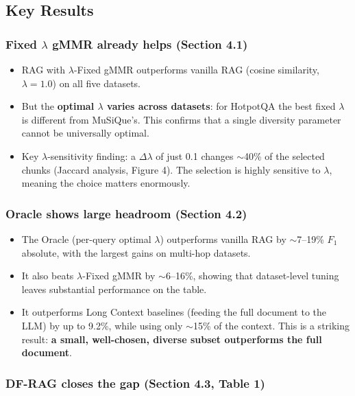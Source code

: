 \documentclass[11pt,a4paper]{article}
\begin{document}
\subsection{Key Results}

\subsubsection{Fixed $\lambda$ gMMR already helps (Section 4.1)}

\begin{itemize}[leftmargin=*]
	\item RAG with $\lambda$-Fixed gMMR outperforms vanilla RAG (cosine similarity, $\lambda = 1.0$) on all five datasets.
	\item But the \textbf{optimal $\lambda$ varies across datasets}: for HotpotQA the best fixed $\lambda$ is different from MuSiQue's. This confirms that a single diversity parameter cannot be universally optimal.
	\item Key $\lambda$-sensitivity finding: a $\Delta\lambda$ of just 0.1 changes $\sim$40\% of the selected chunks (Jaccard analysis, Figure 4). The selection is highly sensitive to $\lambda$, meaning the choice matters enormously.
\end{itemize}

\subsubsection{Oracle shows large headroom (Section 4.2)}

\begin{itemize}[leftmargin=*]
	\item The Oracle (per-query optimal $\lambda$) outperforms vanilla RAG by $\sim$7--19\% $F_1$ absolute, with the largest gains on multi-hop datasets.
	\item It also beats $\lambda$-Fixed gMMR by $\sim$6--16\%, showing that dataset-level tuning leaves substantial performance on the table.
	\item It outperforms Long Context baselines (feeding the full document to the LLM) by up to 9.2\%, while using only $\sim$15\% of the context. This is a striking result: \textbf{a small, well-chosen, diverse subset outperforms the full document}.
\end{itemize}

\subsubsection{DF-RAG closes the gap (Section 4.3, Table 1)}
\end{document}
